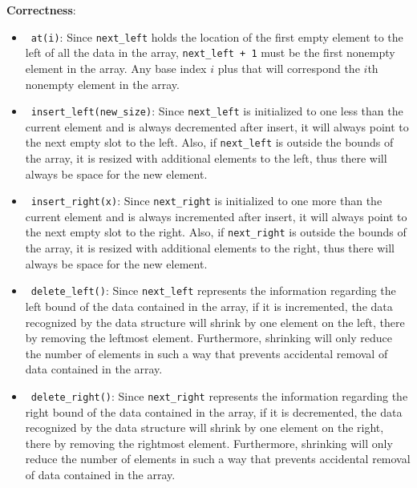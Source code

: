 \documentclass[12pt,twoside]{article}
\begin{document}
\begin{problems}
    \smallbreak

    {\bf Correctness}: 

    \begin{itemize}
        \item \ {\tt at(i)}: Since {\tt next\_left} holds the location of the
            first empty element to the left of all the data in the array,
            {\tt next\_left + 1} must be the first nonempty element in the
            array. Any base index $ i $ plus that will correspond the $i$th
            nonempty element in the array.
        \item \ {\tt insert\_left(new\_size)}: Since {\tt next\_left} is
            initialized to one less than the current element and is always
            decremented after insert, it will always point to the next empty
            slot to the left. Also, if {\tt next\_left} is outside the bounds
            of the array, it is resized with additional elements to the left,
            thus there will always be space for the new element.
        \item \ {\tt insert\_right(x)}: Since {\tt next\_right} is
            initialized to one more than the current element and is always
            incremented after insert, it will always point to the next empty
            slot to the right. Also, if {\tt next\_right} is outside the bounds
            of the array, it is resized with additional elements to the
            right, thus there will always be space for the new element.
        \item \ {\tt delete\_left()}: Since {\tt next\_left} represents the
            information regarding the left bound of the data contained in the
            array, if it is incremented, the data recognized by the data
            structure will shrink by one element on the left, there by
            removing the leftmost element. Furthermore, shrinking will only
            reduce the number of elements in such a way that prevents
            accidental removal of data contained in the array.
        \item \ {\tt delete\_right()}: Since {\tt next\_right} represents the
            information regarding the right bound of the data contained in the
            array, if it is decremented, the data recognized by the data
            structure will shrink by one element on the right, there by
            removing the rightmost element. Furthermore, shrinking will only
            reduce the number of elements in such a way that prevents
            accidental removal of data contained in the array.
    \end{itemize}


\end{problems}
\end{document}

